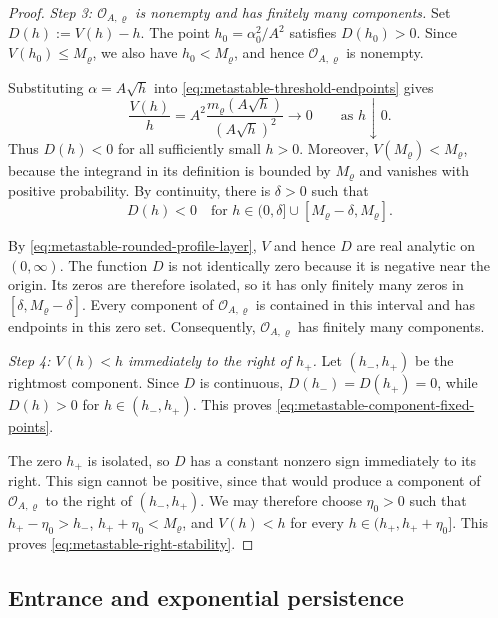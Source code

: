 \documentclass[11pt,reqno,a4paper]{article}
\begin{document}
\begin{proof}
  \emph{Step 3: $\mathcal O_{A,\varrho}$ is nonempty and has finitely many
  components.}
  Set $D(h):=V(h)-h$. The point $h_0=\alpha_0^2/A^2$ satisfies
  $D(h_0)>0$. Since $V(h_0)\leq M_\varrho$, we also have $h_0<M_\varrho$,
  and hence $\mathcal O_{A,\varrho}$ is nonempty.

  Substituting $\alpha=A\sqrt h$ into
  \cref{eq:metastable-threshold-endpoints} gives
  \begin{equation*}
    \frac{V(h)}h
    =
    A^2\frac{m_\varrho(A\sqrt h)}{(A\sqrt h)^2}
    \longrightarrow0
    \qquad\mbox{as }h\downarrow0.
  \end{equation*}
  Thus $D(h)<0$ for all sufficiently small $h>0$. Moreover,
  $V(M_\varrho)<M_\varrho$, because the integrand in its definition is bounded
  by $M_\varrho$ and vanishes with positive probability. By continuity, there
  is $\delta>0$ such that
  \begin{equation*}
    D(h)<0
    \quad\mbox{for }
    h\in(0,\delta]\cup[M_\varrho-\delta,M_\varrho].
  \end{equation*}

  By \cref{eq:metastable-rounded-profile-layer}, $V$ and hence $D$ are real
  analytic on $(0,\infty)$. The function $D$ is not identically zero because
  it is negative near the origin. Its zeros are therefore isolated, so it has
  only finitely many zeros in $[\delta,M_\varrho-\delta]$. Every component of
  $\mathcal O_{A,\varrho}$ is contained in this interval and has endpoints in
  this zero set. Consequently, $\mathcal O_{A,\varrho}$ has finitely many
  components.

  \emph{Step 4: $V(h)<h$ immediately to the right of $h_+$.}
  Let $(h_-,h_+)$ be the rightmost component. Since $D$ is continuous,
  $D(h_-)=D(h_+)=0$, while $D(h)>0$ for $h\in(h_-,h_+)$. This proves
  \cref{eq:metastable-component-fixed-points}.

  The zero $h_+$ is isolated, so $D$ has a constant nonzero sign immediately
  to its right. This sign cannot be positive, since that would produce a
  component of $\mathcal O_{A,\varrho}$ to the right of $(h_-,h_+)$. We may
  therefore choose $\eta_0>0$ such that
  $h_+-\eta_0>h_-$, $h_++\eta_0<M_\varrho$, and $V(h)<h$ for every
  $h\in(h_+,h_++\eta_0]$. This proves
  \cref{eq:metastable-right-stability}.
\end{proof}

\subsection{Entrance and exponential persistence}
\label{subsec:metastable-entrance-persistence}
\end{document}
